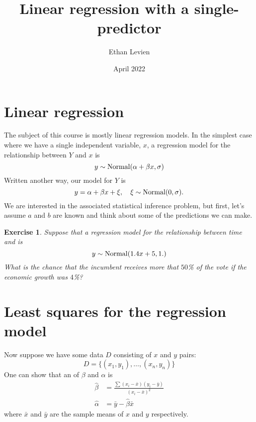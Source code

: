 \documentclass{amsart}
\title{Linear regression with a single-predictor}
\author{Ethan Levien}
\date{April 2022}
\newtheorem{exercise}{Exercise}
\begin{document}
\maketitle

\tableofcontents



\section{Linear regression}
The subject of this course is mostly linear regression models. In the simplest case where we have a single independent variable, $x$, a regression model for the relationship between $Y$ and  $x$ is 
\begin{equation}
y \sim {\rm Normal}(\alpha + \beta x,\sigma)
\end{equation}
Written another way, our model for $Y$ is 
\begin{equation}
y =\alpha + \beta x + \xi,\quad \xi \sim {\rm Normal}(0,\sigma).
\end{equation}
We are interested in the associated statistical inference problem, but first, let's assume $a$ and $b$ are known and think about some of the predictions we can make.  

\begin{exercise} Suppose that a regression model for the relationship between time and is 
\begin{equation}
y \sim {\rm Normal}(1.4 x+ 5,1.)
\end{equation}
What is the chance that the incumbent receives more that $50$\% of the vote if the economic growth was $4$\%?
\end{exercise}



\section{Least squares for the regression model}
Now suppose we have some data $D$ consisting of $x$ and $y$ pairs:
\begin{equation}
D = \{(x_1,y_1),\dots,(x_n,y_n)\}
\end{equation}
One can show that an of $\beta$ and $\alpha$ is 
\begin{align}
\hat{\beta} &= \frac{\sum (x_i - \bar{x})(y_i - \bar{y})}{(x_i-\bar{x})^2} \\
\hat{\alpha} &= \bar{y} - \hat{\beta} \bar{x}
\end{align}
where $\bar{x}$ and $\bar{y}$ are the sample means of $x$ and $y$ respectively. 
\end{document}
